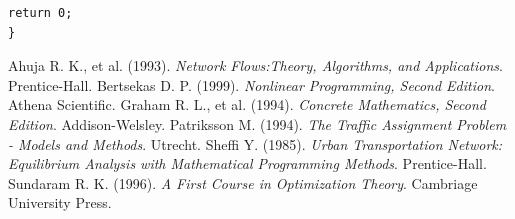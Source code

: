 \documentclass[a4paper,12pt]{article}
\begin{document}
\begin{CJK*}{UTF8}{gbsn}
\begin{lstlisting}[caption={最短路径算法}, label={shortestpath}]
    return 0;
}

\end{lstlisting}










\theendnotes

\begin{thebibliography}{6}
 Ahuja R. K., et al. (1993). \newblock \emph{Network Flows:Theory, Algorithms, and Applications}.
\newblock Prentice-Hall.
 Bertsekas D. P. (1999). \newblock \emph{Nonlinear Programming, Second Edition}.
\newblock Athena Scientific.
 Graham R. L., et al. (1994). \newblock \emph{Concrete Mathematics, Second Edition}.
\newblock Addison-Welsley.
 Patriksson M. (1994). \newblock \emph{The Traffic Assignment Problem - Models and Methods}.
\newblock Utrecht.
 Sheffi Y. (1985). \newblock \emph{Urban Transportation Network: Equilibrium Analysis with
Mathematical Programming Methods}. \newblock Prentice-Hall.
 Sundaram R. K. (1996). \newblock \emph{A First Course in Optimization Theory}.
\newblock Cambriage University Press.
\end{thebibliography}

\end{CJK*}
\end{document}
